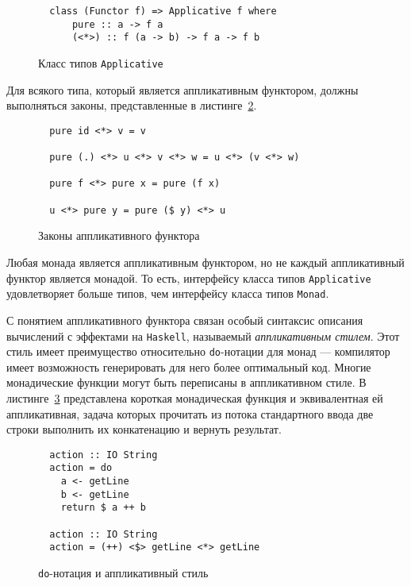   \begin{figure}[h]
  \begin{lstlisting}
  class (Functor f) => Applicative f where
      pure :: a -> f a
      (<*>) :: f (a -> b) -> f a -> f b
  \end{lstlisting}
  \caption{Класс типов \lstinline{Applicative}}
  \label{listing:Applicative}
  \end{figure}

  Для всякого типа, который является аппликативным функтором, должны выполняться
  законы, представленные в листинге~\ref{listing:ApplicativeLaws}.

  \begin{figure}[h]
  \begin{lstlisting}
  pure id <*> v = v

  pure (.) <*> u <*> v <*> w = u <*> (v <*> w)

  pure f <*> pure x = pure (f x)

  u <*> pure y = pure ($ y) <*> u
  \end{lstlisting}
  \caption{Законы аппликативного функтора}
  \label{listing:ApplicativeLaws}
  \end{figure}

  Любая монада является аппликативным функтором, но не каждый аппликативный
  функтор является монадой. То есть, интерфейсу класса типов
  \lstinline{Applicative} удовлетворяет больше типов, чем интерфейсу класса типов
  \lstinline{Monad}.

  С понятием аппликативного функтора связан особый синтаксис описания вычислений с
  эффектами на \lstinline{Haskell}, называемый \emph{аппликативным стилем}. Этот
  стиль имеет преимущество относительно \lstinline{do}-нотации для монад ---
  компилятор имеет возможность генерировать для него более оптимальный код.
  Многие монадические функции могут быть переписаны в аппликативном стиле.
  В листинге~\ref{listing:MonadApplicative} представлена короткая монадическая
  функция и эквивалентная ей аппликативная, задача которых прочитать из потока
  стандартного ввода две строки выполнить их конкатенацию и вернуть результат.

  \begin{figure}
  \begin{lstlisting}
  action :: IO String
  action = do
    a <- getLine
    b <- getLine
    return $ a ++ b

  action :: IO String
  action = (++) <$> getLine <*> getLine
  \end{lstlisting}
  \caption{\lstinline{do}-нотация и аппликативный стиль}
  \label{listing:MonadApplicative}
  \end{figure}

